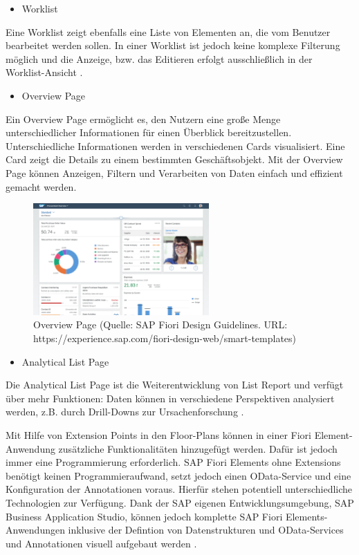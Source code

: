 \begin{itemize}[noitemsep]
\item Worklist
\end{itemize}

Eine Worklist zeigt ebenfalls eine Liste von Elementen an, die vom Benutzer bearbeitet werden sollen. In einer Worklist ist jedoch keine komplexe Filterung möglich und die Anzeige, bzw. das Editieren erfolgt ausschließlich in der Worklist-Ansicht \cite{sap:ufef}.

\begin{itemize}[noitemsep]
\item Overview Page
\end{itemize}

Ein Overview Page ermöglicht es, den Nutzern eine große Menge unterschiedlicher Informationen für einen Überblick bereitzustellen. Unterschiedliche Informationen werden in verschiedenen Cards visualisiert. Eine Card zeigt die Details zu einem bestimmten Geschäftsobjekt. Mit der Overview Page können Anzeigen, Filtern und Verarbeiten von Daten einfach und effizient gemacht werden.

\begin{figure}[htbp]
 \centering
 \includegraphics[width=0.6\textwidth]{Bilder/fiori_element/Overview-page.png}
 \caption{Overview Page (Quelle: SAP Fiori Design Guidelines. URL: https://experience.sap.com/fiori-design-web/smart-templates)}
\end{figure} 

\begin{itemize}[noitemsep]
\item Analytical List Page
\end{itemize}

Die Analytical List Page ist die Weiterentwicklung von List Report und verfügt über mehr Funktionen: Daten können in verschiedene Perspektiven analysiert werden, z.B. durch Drill-Downs zur Ursachenforschung \cite{sap:ufef}.

Mit Hilfe von Extension Points in den Floor-Plans können in einer Fiori Element-Anwendung zusätzliche Funktionalitäten hinzugefügt werden. Dafür ist jedoch immer eine Programmierung erforderlich.
SAP Fiori Elements ohne Extensions benötigt keinen Programmieraufwand, setzt jedoch einen OData-Service und eine Konfiguration der Annotationen voraus. Hierfür stehen potentiell unterschiedliche Technologien zur Verfügung. Dank der SAP eigenen Entwicklungsumgebung, SAP Business Application Studio, können jedoch komplette SAP Fiori Elements-Anwendungen inklusive der Defintion von Datenstrukturen und OData-Services und Annotationen visuell aufgebaut werden \cite{sap:dafe}.



